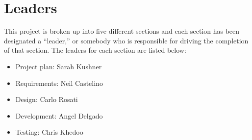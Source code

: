 \documentclass[12pt]{article}
\begin{document}
\section{Leaders}
This project is broken up into five different sections and each section has been designated a ``leader,” or somebody who is responsible for driving the completion of that section. The leaders for each section are listed below:
\begin{itemize}
 \item Project plan: Sarah Kushner
 \item Requirements: Neil Castelino
 \item Design: Carlo Rosati
 \item Development: Angel Delgado
 \item Testing: Chris Khedoo
\end{itemize}
\end{document}
